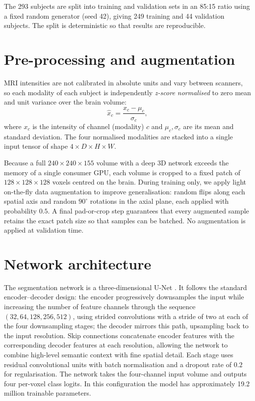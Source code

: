 The 293 subjects are split into training and validation sets in an 85:15 ratio
using a fixed random generator (seed 42), giving 249 training and 44 validation
subjects. The split is deterministic so that results are reproducible.

\section{Pre-processing and augmentation}
\label{sec:preproc}

MRI intensities are not calibrated in absolute units and vary between scanners, so
each modality of each subject is independently \emph{z-score normalised} to zero
mean and unit variance over the brain volume:
\begin{equation}
\hat{x}_{c} = \frac{x_{c} - \mu_{c}}{\sigma_{c}},
\end{equation}
where $x_c$ is the intensity of channel (modality) $c$ and $\mu_c,\sigma_c$ are its
mean and standard deviation. The four normalised modalities are stacked into a
single input tensor of shape $4\times D\times H\times W$.

Because a full $240\times240\times155$ volume with a deep 3D network exceeds the
memory of a single consumer GPU, each volume is cropped to a fixed patch of
$128\times128\times128$ voxels centred on the brain. During training only, we
apply light on-the-fly data augmentation to improve generalisation: random flips
along each spatial axis and random $90^{\circ}$ rotations in the axial plane, each
applied with probability $0.5$. A final pad-or-crop step guarantees that every
augmented sample retains the exact patch size so that samples can be batched. No
augmentation is applied at validation time.

\section{Network architecture}
\label{sec:arch}

The segmentation network is a three-dimensional U-Net
\citep{ronneberger2015unet,cicek20163dunet}. It follows the standard
encoder--decoder design: the encoder progressively downsamples the input while
increasing the number of feature channels through the sequence
$(32, 64, 128, 256, 512)$, using strided convolutions with a stride of two at each
of the four downsampling stages; the decoder mirrors this path, upsampling back to
the input resolution. Skip connections concatenate encoder features with the
corresponding decoder features at each resolution, allowing the network to combine
high-level semantic context with fine spatial detail. Each stage uses residual
convolutional units with batch normalisation and a dropout rate of $0.2$ for
regularisation. The network takes the four-channel input volume and outputs four
per-voxel class logits. In this configuration the model has approximately
19.2 million trainable parameters.

